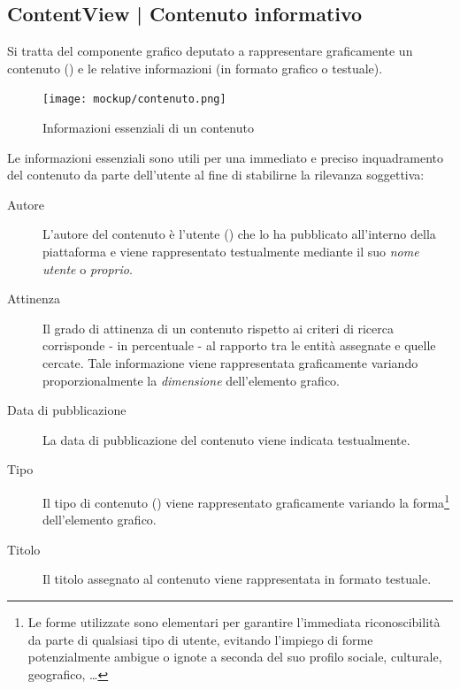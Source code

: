 \documentclass[10pt,a4paper,headinclude,footinclude,hidelinks]{scrreprt} %
\begin{document}
	\subsection[ContentView]{ContentView | Contenuto informativo}
	\label{sec:stage:design:view:content-widget}
	Si tratta del componente grafico deputato a rappresentare graficamente un contenuto (\textit{}) e le relative informazioni (in formato grafico o testuale).

	\begin{figure}[ht]
		\begin{center}
	    	\texttt{[image: mockup/contenuto.png]}
			\label{gfx:mockup:content}
			\caption{Informazioni essenziali di un contenuto}
		\end{center}
	\end{figure}

	Le informazioni essenziali sono utili per una immediato e preciso inquadramento del contenuto da parte dell'utente al fine di stabilirne la rilevanza soggettiva:
	\begin{description}
	\item[Autore] L'autore del contenuto è l'utente (\textit{}) che lo ha pubblicato all'interno della piattaforma e viene rappresentato testualmente mediante il suo \textit{nome utente} o \textit{proprio}.
	\item[Attinenza] Il grado di attinenza di un contenuto rispetto ai criteri di ricerca corrisponde - in percentuale - al rapporto tra le entità assegnate e quelle cercate. Tale informazione viene rappresentata graficamente variando proporzionalmente la \textit{dimensione} dell'elemento grafico.
	\item[Data di pubblicazione] La data di pubblicazione del contenuto viene indicata testualmente.
	\item[Tipo] Il tipo di contenuto (\textit{}) viene rappresentato graficamente variando la forma\footnote{Le forme utilizzate sono elementari per garantire l'immediata riconoscibilità da parte di qualsiasi tipo di utente, evitando l'impiego di forme potenzialmente ambigue o ignote a seconda del suo profilo sociale, culturale, geografico, \ldots} dell'elemento grafico.
	\item[Titolo] Il titolo assegnato al contenuto viene rappresentata in formato testuale.
	\end{description}
\end{document}
